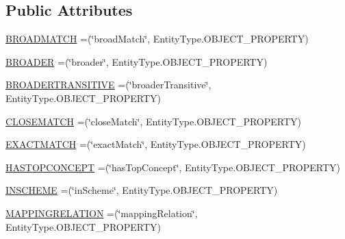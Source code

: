 \subsection*{Public Attributes}
\begin{DoxyCompactItemize}
\item 
\hyperlink{enumorg_1_1semanticweb_1_1owlapi_1_1vocab_1_1_s_k_o_s_vocabulary_a1ebcbbabe3fefd928975af1370bcb882}{B\-R\-O\-A\-D\-M\-A\-T\-C\-H} =(\char`\"{}broad\-Match\char`\"{}, Entity\-Type.\-O\-B\-J\-E\-C\-T\-\_\-\-P\-R\-O\-P\-E\-R\-T\-Y)
\item 
\hyperlink{enumorg_1_1semanticweb_1_1owlapi_1_1vocab_1_1_s_k_o_s_vocabulary_a7e7064e622716efaafdd1dd753d2b01a}{B\-R\-O\-A\-D\-E\-R} =(\char`\"{}broader\char`\"{}, Entity\-Type.\-O\-B\-J\-E\-C\-T\-\_\-\-P\-R\-O\-P\-E\-R\-T\-Y)
\item 
\hyperlink{enumorg_1_1semanticweb_1_1owlapi_1_1vocab_1_1_s_k_o_s_vocabulary_a6f8da3e20e6482823282e8ad2dae17ab}{B\-R\-O\-A\-D\-E\-R\-T\-R\-A\-N\-S\-I\-T\-I\-V\-E} =(\char`\"{}broader\-Transitive\char`\"{}, Entity\-Type.\-O\-B\-J\-E\-C\-T\-\_\-\-P\-R\-O\-P\-E\-R\-T\-Y)
\item 
\hyperlink{enumorg_1_1semanticweb_1_1owlapi_1_1vocab_1_1_s_k_o_s_vocabulary_a9f00e5f56080abc32a66d845121ebef8}{C\-L\-O\-S\-E\-M\-A\-T\-C\-H} =(\char`\"{}close\-Match\char`\"{}, Entity\-Type.\-O\-B\-J\-E\-C\-T\-\_\-\-P\-R\-O\-P\-E\-R\-T\-Y)
\item 
\hyperlink{enumorg_1_1semanticweb_1_1owlapi_1_1vocab_1_1_s_k_o_s_vocabulary_a970bd5052a4efd0ea638835dd509ecc6}{E\-X\-A\-C\-T\-M\-A\-T\-C\-H} =(\char`\"{}exact\-Match\char`\"{}, Entity\-Type.\-O\-B\-J\-E\-C\-T\-\_\-\-P\-R\-O\-P\-E\-R\-T\-Y)
\item 
\hyperlink{enumorg_1_1semanticweb_1_1owlapi_1_1vocab_1_1_s_k_o_s_vocabulary_a9e40409cf50b20e32496c23dfd55a4d9}{H\-A\-S\-T\-O\-P\-C\-O\-N\-C\-E\-P\-T} =(\char`\"{}has\-Top\-Concept\char`\"{}, Entity\-Type.\-O\-B\-J\-E\-C\-T\-\_\-\-P\-R\-O\-P\-E\-R\-T\-Y)
\item 
\hyperlink{enumorg_1_1semanticweb_1_1owlapi_1_1vocab_1_1_s_k_o_s_vocabulary_af3a644a9719586025ad56902aa170e9c}{I\-N\-S\-C\-H\-E\-M\-E} =(\char`\"{}in\-Scheme\char`\"{}, Entity\-Type.\-O\-B\-J\-E\-C\-T\-\_\-\-P\-R\-O\-P\-E\-R\-T\-Y)
\item 
\hyperlink{enumorg_1_1semanticweb_1_1owlapi_1_1vocab_1_1_s_k_o_s_vocabulary_adca0d2875a8723797edff3f6b6674a73}{M\-A\-P\-P\-I\-N\-G\-R\-E\-L\-A\-T\-I\-O\-N} =(\char`\"{}mapping\-Relation\char`\"{}, Entity\-Type.\-O\-B\-J\-E\-C\-T\-\_\-\-P\-R\-O\-P\-E\-R\-T\-Y)
\item 

\end{DoxyCompactItemize}
